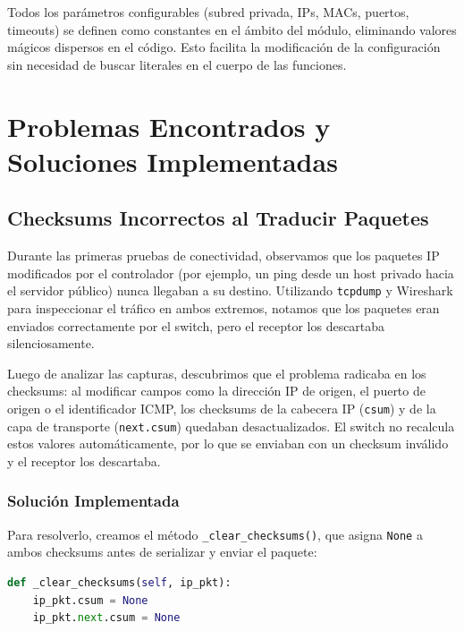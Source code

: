 \documentclass[11pt, a4paper]{article}
\begin{document}
Todos los parámetros configurables (subred privada, IPs, MACs, puertos, timeouts) se definen como constantes en el ámbito del módulo, eliminando valores mágicos dispersos en el código. Esto facilita la modificación de la configuración sin necesidad de buscar literales en el cuerpo de las funciones.


\section{Problemas Encontrados y Soluciones Implementadas}
\label{sec:problemas_soluciones}

\vspace{0.5cm}

\subsection{Checksums Incorrectos al Traducir Paquetes}

Durante las primeras pruebas de conectividad, observamos que los paquetes IP modificados por el controlador (por ejemplo, un ping desde un host privado hacia el servidor público) nunca llegaban a su destino. Utilizando \texttt{tcpdump} y Wireshark para inspeccionar el tráfico en ambos extremos, notamos que los paquetes eran enviados correctamente por el switch, pero el receptor los descartaba silenciosamente.

Luego de analizar las capturas, descubrimos que el problema radicaba en los checksums: al modificar campos como la dirección IP de origen, el puerto de origen o el identificador ICMP, los checksums de la cabecera IP (\texttt{csum}) y de la capa de transporte (\texttt{next.csum}) quedaban desactualizados. El switch no recalcula estos valores automáticamente, por lo que se enviaban con un checksum inválido y el receptor los descartaba.

\subsubsection{Solución Implementada}

Para resolverlo, creamos el método \texttt{\_clear\_checksums()}, que asigna \texttt{None} a ambos checksums antes de serializar y enviar el paquete:

\begin{lstlisting}[language=Python, caption=Método \texttt{\_clear\_checksums} en \texttt{protorouter.py}.]
def _clear_checksums(self, ip_pkt):
    ip_pkt.csum = None
    ip_pkt.next.csum = None
\end{lstlisting}
\end{document}
